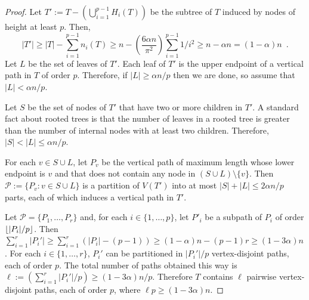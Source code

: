 \documentclass[lotsofwhite]{patmorin}
\DeclarePairedDelimiter{\floor}{\lfloor}{\rfloor}
\renewcommand{\ge}{\geqslant}
\renewcommand{\le}{\leqslant}
\theoremstyle{plain}
\theoremstyle{definition}
\begin{document}
\begin{proof}
  Let $T':=T-(\bigcup_{i=1}^{p-1} H_i(T))$ be the subtree of $T$ induced by nodes of height at least $p$.  Then,
  \[
    |T'|\ge |T| - \sum_{i=1}^{p-1} n_i(T)
    \ge n - \left(\frac{6\alpha n}{\pi^2}\right)\sum_{i=1}^{p-1} 1/i^2
    \ge  n-\alpha n = (1-\alpha)n \enspace .
  \]
  Let $L$ be the set of leaves of $T'$.  Each leaf of $T'$ is the upper endpoint of a vertical path in $T$ of order $p$.  Therefore, if $|L|\ge \alpha n/p$ then we are done, so assume that $|L|<\alpha n/p$.

  Let $S$ be the set of nodes of $T'$ that have two or more children in $T'$.  A standard fact about rooted trees is that the number of leaves in a rooted tree is greater than the number of internal nodes with at least two children.  Therefore, $|S|<|L|\le \alpha n/p$.

  For each $v\in S\cup L$, let $P_v$ be the vertical path of maximum length whose lower endpoint is $v$ and that does not contain any node in $(S\cup L)\setminus \{v\}$.  Then $\mathcal{P}:=\{P_v:v\in S\cup L\}$ is a partition of $V(T')$ into at most $|S|+|L|\le 2\alpha n/p$ parts, each of which induces a vertical path in $T'$.

  Let $\mathcal{P}=\{P_1,\ldots,P_r\}$ and, for each $i\in\{1,\ldots,p\}$, let $P'_i$ be a subpath of $P_i$ of order $\floor{|P_i|/p}$.  Then $\sum_{i=1}^r |P_i'|\ge \sum_{i=1}^r (|P_i|-(p-1)) \ge (1-\alpha) n - (p-1)r\ge (1-3\alpha)n$. For each $i\in\{1,\ldots,r\}$, $P_i'$ can be partitioned in $|P_i'|/p$ vertex-disjoint paths, each of order $p$.  The total number of paths obtained this way is $\ell := (\sum_{i=1}^r |P_i'|/p) \ge (1-3\alpha)n/p$.  Therefore $T$ contains $\ell$ pairwise vertex-disjoint paths, each of order $p$, where $\ell p \ge (1-3\alpha)n$.
\end{proof}
\end{document}
